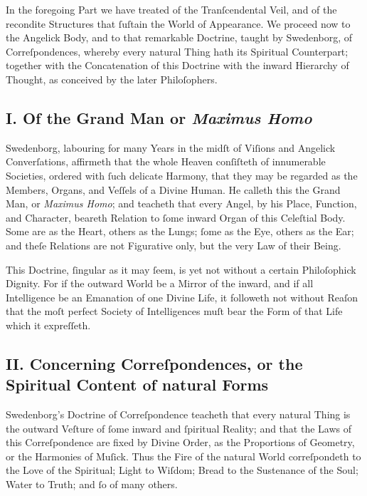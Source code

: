 \documentclass[12pt]{article}
\begin{document}
In the foregoing Part we have treated of the Tranſcendental Veil, and of the 
recondite Structures that ſuſtain the World of Appearance. We proceed now to 
the Angelick Body, and to that remarkable Doctrine, taught by Swedenborg, of 
Correſpondences, whereby every natural Thing hath its Spiritual Counterpart; 
together with the Concatenation of this Doctrine with the inward Hierarchy of 
Thought, as conceived by the later Philoſophers.

\subsection*{I. Of the Grand Man or \textit{Maximus Homo}}

Swedenborg, labouring for many Years in the midſt of Viſions and Angelick 
Converſations, affirmeth that the whole Heaven conſiſteth of innumerable 
Societies, ordered with ſuch delicate Harmony, that they may be regarded as 
the Members, Organs, and Veſſels of a Divine Human. He calleth this the Grand 
Man, or \textit{Maximus Homo}; and teacheth that every Angel, by his Place, 
Function, and Character, beareth Relation to ſome inward Organ of this 
Celeſtial Body. Some are as the Heart, others as the Lungs; ſome as the Eye, 
others as the Ear; and theſe Relations are not Figurative only, but the very 
Law of their Being.

This Doctrine, ſingular as it may ſeem, is yet not without a certain 
Philoſophick Dignity. For if the outward World be a Mirror of the inward, and 
if all Intelligence be an Emanation of one Divine Life, it followeth not 
without Reaſon that the moſt perfect Society of Intelligences muſt bear the 
Form of that Life which it expreſſeth.

\subsection*{II. Concerning Correſpondences, or the Spiritual Content of natural Forms}

Swedenborg’s Doctrine of Correſpondence teacheth that every natural Thing is 
the outward Veſture of ſome inward and ſpiritual Reality; and that the Laws 
of this Correſpondence are fixed by Divine Order, as the Proportions of 
Geometry, or the Harmonies of Muſick. Thus the Fire of the natural World 
correſpondeth to the Love of the Spiritual; Light to Wiſdom; Bread to the 
Sustenance of the Soul; Water to Truth; and ſo of many others.
\end{document}
